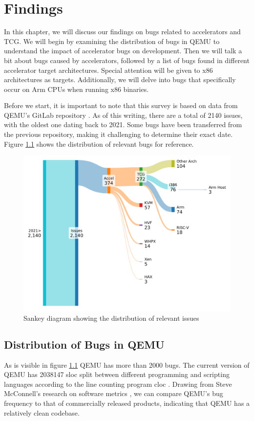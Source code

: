 
\chapter{Findings}\label{chapter:findings}
In this chapter, we will discuss our findings on bugs related to accelerators and \ac{TCG}.
We will begin by examining the distribution of bugs in \ac{QEMU} to understand the impact of accelerator bugs on development.
Then we will talk a bit about bugs caused by accelerators, followed by a list of bugs found in different accelerator target architectures.
Special attention will be given to x86 architectures as targets.
Additionally, we will delve into bugs that specifically occur on Arm CPUs when running x86 binaries.

Before we start, it is important to note that this survey is based on data from \ac{QEMU}'s GitLab repository \cite{qemu_issues}.
As of this writing, there are a total of 2140 issues, with the oldest one dating back to 2021.
Some bugs have been transferred from the previous repository, making it challenging to determine their exact date.
Figure \ref{fig:issues} shows the distribution of relevant bugs for reference.

\begin{figure}[ht]
    \centering
    \includegraphics[width=0.8\linewidth]{figures/issues3}
    \caption[QEMU bug distribution]{Sankey diagram showing the distribution of relevant issues}
    \label{fig:issues}
\end{figure}

\section{Distribution of Bugs in \ac{QEMU}}
As is visible in figure \ref{fig:issues} \ac{QEMU} has more than 2000 bugs.
The current version of \ac{QEMU} has 2038147 \ac{sloc} split between different programming and scripting languages according to the line counting program cloc \cite{cloc}.
Drawing from Steve McConnell's research on software metrics \cite{sloc}, we can compare \ac{QEMU}'s bug frequency to that of commercially released products, indicating that \ac{QEMU} has a relatively clean codebase.

